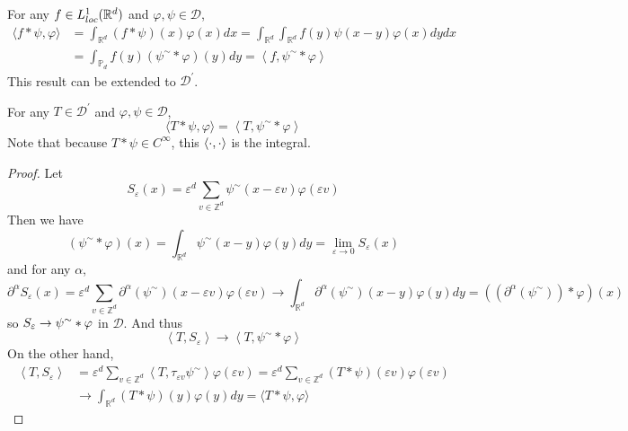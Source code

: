 \begin{enumerate}[label=\arabic*.]
	For any $f \in L^1_{loc}(\mathbb{R}^d)$ and $\varphi,\psi \in \mathcal{D}$,
	\begin{equation*}
		\begin{aligned}
			\langle f * \psi, \varphi\rangle & =\int_{\mathbb{R}^d}(f * \psi)(x) \varphi(x) d x=\int_{\mathbb{R}^d} \int_{\mathbb{R}^d} f(y) \psi(x-y) \varphi(x) d y d x \\
			& =\int_{\mathbb{P}_d} f(y)\left(\psi^{\sim} * \varphi\right)(y) d y=\left\langle f, \psi^{\sim} * \varphi\right\rangle
		\end{aligned}
	\end{equation*}
	This result can be extended to $\mathcal{D}^\prime$.
	\begin{prop}
		For any $T \in \mathcal{D}^\prime$ and $\varphi,\psi \in \mathcal{D}$,
		\begin{equation*}
			\langle T * \psi, \varphi\rangle=\left\langle T, \psi^{\sim} * \varphi\right\rangle
		\end{equation*}
		Note that because $T * \psi \in C^\infty$, this $\langle \cdot,\cdot \rangle$ is the integral.
	\end{prop}

	\begin{proof}
		Let
		\begin{equation*}
			S_{\varepsilon}(x)=\varepsilon^d \sum_{v \in \mathbb{Z}^d} \psi^{\sim}(x-\varepsilon v) \varphi(\varepsilon v)
		\end{equation*}
		Then we have
		\begin{equation*}
			\left(\psi^{\sim} * \varphi\right)(x)=\int_{\mathbb{R}^d} \psi^{\sim}(x-y) \varphi(y) d y=\lim _{\varepsilon \rightarrow 0} S_{\varepsilon}(x)
		\end{equation*}
		and for any $\alpha$,
		\begin{equation*}
			\partial^\alpha S_{\varepsilon}(x)=\varepsilon^d \sum_{v \in \mathbb{Z}^d} \partial^\alpha\left(\psi^{\sim}\right)(x-\varepsilon v) \varphi(\varepsilon v) \rightarrow \int_{\mathbb{R}^d} \partial^\alpha\left(\psi^{\sim}\right)(x-y) \varphi(y) d y=\left(\left(\partial^\alpha\left(\psi^{\sim}\right)\right) * \varphi\right)(x)
		\end{equation*}
		so $S_\varepsilon \rightarrow \psi^{\sim} * \varphi$ in $\mathcal{D}$. And thus
		\begin{equation*}
			\left\langle T, S_{\varepsilon}\right\rangle \rightarrow\left\langle T, \psi^{\sim} * \varphi\right\rangle
		\end{equation*}
		On the other hand,
		\begin{equation*}
			\begin{aligned}
				\left\langle T, S_{\varepsilon}\right\rangle & =\varepsilon^d \sum_{v \in \mathbb{Z}^d}\left\langle T, \tau_{\varepsilon v} \psi^{\sim}\right\rangle \varphi(\varepsilon v)=\varepsilon^d \sum_{v \in \mathbb{Z}^d}(T * \psi)(\varepsilon v) \varphi(\varepsilon v) \\
				& \rightarrow \int_{\mathbb{R}^d}(T * \psi)(y) \varphi(y) d y=\langle T * \psi, \varphi\rangle
			\end{aligned}
		\end{equation*}
	\end{proof}


\end{enumerate}

